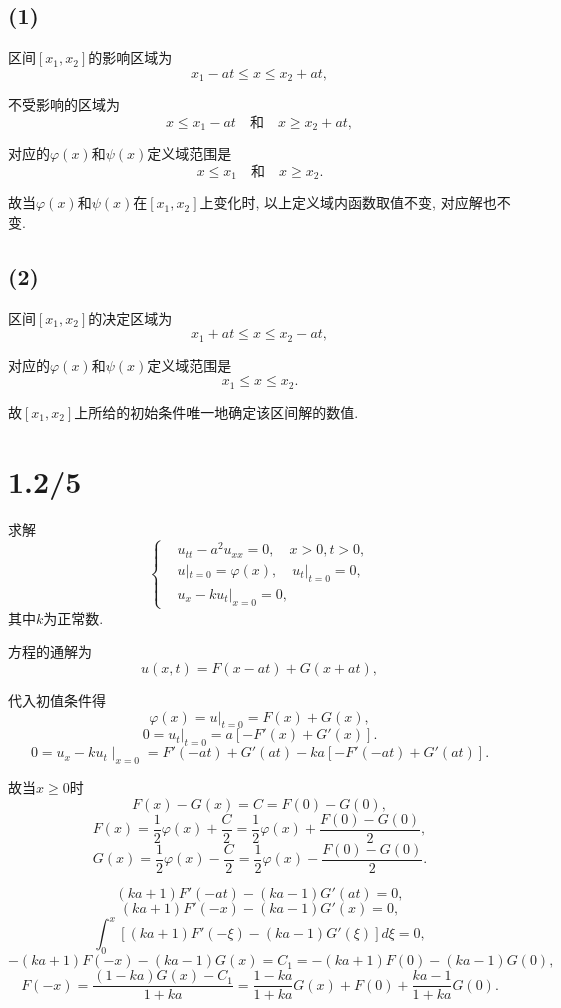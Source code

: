 \documentclass[11pt,a4paper]{article}
\begin{document}
\subsection*{(1)}
区间$[x_1,x_2]$的影响区域为$$x_1-at\leqslant x\leqslant x_2+at,$$

不受影响的区域为$$x\leqslant x_1-at\quad\text{和}\quad x\geqslant x_2+at,$$

对应的$\varphi(x)$和$\psi(x)$定义域范围是$$x\leqslant x_1\quad\text{和}\quad x\geqslant x_2.$$

故当$\varphi(x)$和$\psi(x)$在$[x_1,x_2]$上变化时, 以上定义域内函数取值不变, 对应解也不变.

\subsection*{(2)}

区间$[x_1,x_2]$的决定区域为$$x_1+at\leqslant x\leqslant x_2-at,$$

对应的$\varphi(x)$和$\psi(x)$定义域范围是$$x_1\leqslant x\leqslant x_2.$$

故$[x_1,x_2]$上所给的初始条件唯一地确定该区间解的数值.

\section{1.2/5}
\begin{problem}
求解
$$\left\{\begin{aligned}
     & u_{tt}-a^2u_{xx}=0,\quad x>0,t>0,       \\
     & u|_{t=0}=\varphi(x),\quad u_t|_{t=0}=0, \\
     & u_x-ku_t|_{x=0}=0,
  \end{aligned}\right. $$
其中$k$为正常数.
\end{problem}

方程的通解为
$$u(x,t)=F(x-at)+G(x+at),$$

代入初值条件得
$$\varphi(x)=u|_{t=0}=F(x)+G(x),$$
$$0=u_t|_{t=0}=a[-F'(x)+G'(x)].$$
$$0=u_x-ku_t\mid_{x=0}=F'(-at)+G'(at)-ka[-F'(-at)+G'(at)].$$

故当$x\geqslant 0$时
$$F(x)-G(x)=C=F(0)-G(0),$$
$$F(x)=\frac{1}{2}\varphi(x)+\frac{C}{2}=\frac{1}{2}\varphi(x)+\frac{F(0)-G(0)}{2},$$
$$G(x)=\frac{1}{2}\varphi(x)-\frac{C}{2}=\frac{1}{2}\varphi(x)-\frac{F(0)-G(0)}{2}.$$

$$(ka+1)F'(-at)-(ka-1)G'(at)=0,$$
$$(ka+1)F'(-x)-(ka-1)G'(x)=0,$$
$$\int_0^x[(ka+1)F'(-\xi)-(ka-1)G'(\xi)]d\xi=0,$$
$$-(ka+1)F(-x)-(ka-1)G(x)=C_1=-(ka+1)F(0)-(ka-1)G(0),$$
$$F(-x)=\frac{(1-ka)G(x)-C_1}{1+ka}=\frac{1-ka}{1+ka}G(x)+F(0)+\frac{ka-1}{1+ka}G(0).$$
\end{document}
